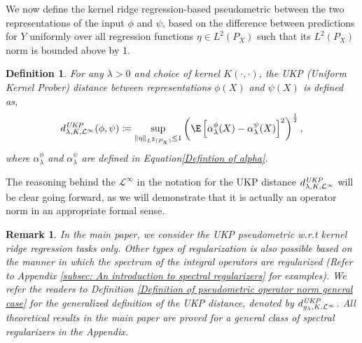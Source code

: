 \documentclass{article} %
\newcommand{\repone}{\phi}
\newcommand{\reptwo}{\psi}
\newcommand{\gl}{g_{\lambda}}
\newcommand{\norm}[1]{\left\|#1\right\|}
\newcommand{\LPtwo}{L^{2}(P_{X})}
\newcommand{\metricstname}{UKP }
\newcommand{\metricfullname}{Uniform Kernel Prober}
\newcommand{\dop}{d_{\lambda,K,\mathcal{L}^{\infty}}^{\emph{\metricstname}}}
\newcommand{\dopgl}{d_{\gl,K,\mathcal{L}^{\infty}}^{\emph{\metricstname}}}
\newcommand{\trt}[1]{\textcolor{red}{#1}}
\theoremstyle{plain}
\newcounter{definitionno}
\newcounter{remarkno}
\newtheorem{definition}[definitionno]{Definition}
\newtheorem{remark}[remarkno]{Remark}
\begin{document}
We now define the kernel ridge regression-based pseudometric between the two representations of the input $\repone$ and $\reptwo$, based on the difference between predictions for $Y$ uniformly over all regression functions $\eta \in \LPtwo$ such that its $\LPtwo$ norm is bounded above by 1.
\begin{definition}\label{Definition of pseudometric}
    For any $\lambda>0$ and choice of kernel $K(\cdot,\cdot)$, the \metricstname (\metricfullname) distance between representations $\repone(X)$ and $\reptwo(X)$ is defined as, 
    \[
    \dop(\repone,\reptwo) \coloneq \underset{\norm{\eta}_{\LPtwo} \leq 1}{\sup} \left(\E\left[\alpha_{\lambda}^{\repone}(X)-\alpha_{\lambda}^{\reptwo}(X)\right]^{2}\right)^{\frac{1}{2}},
    \]
    where $\alpha_{\lambda}^{\repone}$ and $\alpha_{\lambda}^{\reptwo}$ are defined in Equation\ref{Defintion of alpha}.
\end{definition}
The reasoning behind the $\mathcal{L}^{\infty}$ in the notation for the \metricstname distance $\dop$ will be clear going forward, as we will demonstrate that it is actually an operator norm in an appropriate formal sense.

\begin{remark}
    In the main paper, we consider the  \metricstname pseudometric w.r.t kernel ridge regression tasks only. Other types of regularization is also possible based on the manner in which the spectrum of the integral operators are regularized (Refer to Appendix \ref{subsec: An introduction to spectral regularizers} for examples). We refer the readers to Definition \ref{Definition of pseudometric operator norm general case} for the generalized definition of the \metricstname distance, denoted by $\dopgl$. All theoretical results in the main paper are proved for a general class of spectral regularizers in the Appendix. 
\end{remark}

\end{document}
